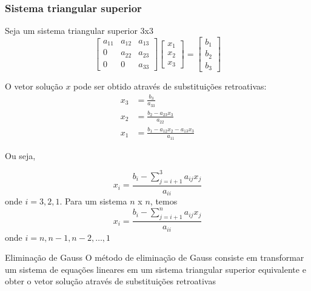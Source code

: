 \begin{frame}
    \frametitle{Sistema triangular superior}

    Seja um sistema triangular superior 3x3
    \[
        \begin{bmatrix}
            a_{11} & a_{12} & a_{13} \\
            0      & a_{22} & a_{23} \\
            0      & 0      & a_{33}
        \end{bmatrix}
        \begin{bmatrix}
            x_1 \\ x_2 \\ x_3
        \end{bmatrix}
        =
        \begin{bmatrix}
            b_1 \\ b_2 \\ b_3
        \end{bmatrix}
    \]

    O vetor solução \( x\) pode ser obtido através de substituições retroativas:
    \begin{align*}
        x_3 &= \frac{b_3}{a_{33}} \\
        x_2 & = \frac{b_2 - a_{23}x_3}{a_{22}} \\
        x_1 &= \frac{b_1 - a_{12}x_2 - a_{13}x_3}{a_{11}}
    \end{align*}
\end{frame}

\begin{frame}
    Ou seja,

    \[
        x_i = \frac{b_i - \sum_{j=i+1}^{3} {a_{ij} x_j}}{a_{ii}}
    \]
    onde \(i = 3, 2, 1\). Para um sistema \(n\) x \(n\), temos
    \[
        x_i = \frac{b_i - \sum_{j=i+1}^{n} {a_{ij} x_j}}{a_{ii}}
    \]
    onde \(i = n, n-1, n-2, \ldots , 1\)

    \begin{block}{Eliminação de Gauss}
        O método de eliminação de Gauss consiste em transformar um sistema de equações lineares em um sistema triangular superior equivalente e obter o vetor solução através de substituições retroativas
    \end{block}
\end{frame}

